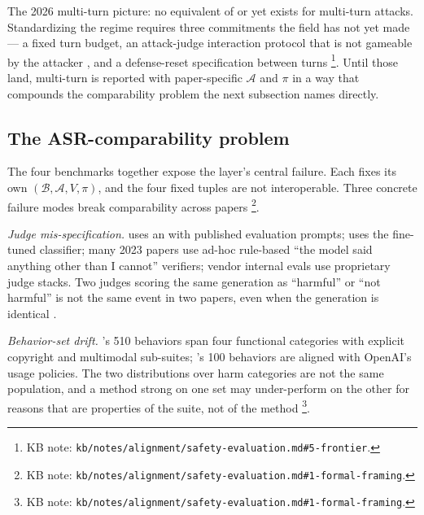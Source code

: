 The 2026 multi-turn picture: no equivalent of  or
 yet exists for multi-turn attacks. Standardizing
the regime requires three commitments the field has not yet made
--- a fixed turn budget, an attack-judge interaction protocol
that is not gameable by the attacker , and a defense-reset
specification between turns%
\footnote{KB note: \texttt{kb/notes/alignment/safety-evaluation.md\#5-frontier}.}.
Until those land, multi-turn  is reported with paper-specific
$\mathcal{A}$ and $\pi$ in a way that compounds the comparability
problem the next subsection names directly.

\subsection{The ASR-comparability problem}
\label{sec:safety-asr-comparability}

The four benchmarks together expose the layer's central failure.
Each fixes its own $(\mathcal{B}, \mathcal{A}, V, \pi)$, and the
four fixed tuples are not interoperable. Three concrete failure
modes break  comparability across papers%
\footnote{KB note: \texttt{kb/notes/alignment/safety-evaluation.md\#1-formal-framing}.}.

\emph{Judge mis-specification.}  uses an 
with published evaluation prompts;  uses the fine-tuned
 classifier; many 2023 papers use ad-hoc rule-based
``the model said anything other than I cannot'' verifiers; vendor
internal evals use proprietary judge stacks. Two judges scoring the
same generation as ``harmful'' or ``not harmful'' is not the same
event in two papers, even when the generation is identical
\citep[\S{}abstract]{chao2024-jailbreakbench}.

\emph{Behavior-set drift.} 's 510 behaviors span four
functional categories with explicit copyright and multimodal
sub-suites; 's 100 behaviors are aligned with OpenAI's
usage policies. The two distributions over harm categories are
not the same population, and a method strong on one set may
under-perform on the other for reasons that are properties of the
suite, not of the method%
\footnote{KB note: \texttt{kb/notes/alignment/safety-evaluation.md\#1-formal-framing}.}.


